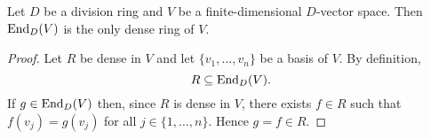 %
%

\begin{proposition}
	\label{pro:unique_dense}
	Let $D$ be a division ring and 
    $V$ be a finite-dimensional $D$-vector space.  
	Then $\operatorname{End}_D(V)$ is the only dense ring of $V$.
\end{proposition}

\begin{proof}
	Let $R$ be dense in $V$ and let $\{v_1,\dots,v_n\}$ be a basis of $V$. By definition,
	\[
    R\subseteq\operatorname{End}_D(V).
    \]
    If $g\in\operatorname{End}_D(V)$ then, since $R$ is dense in $V$, there
	exists $f\in R$ such that $f(v_j)=g(v_j)$ for all 
	$j\in\{1,\dots,n\}$. Hence $g=f\in R$.
\end{proof}


